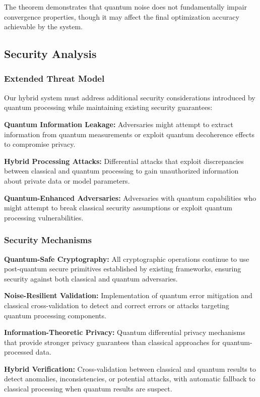 \documentclass[10pt,journal,compsoc]{IEEEtran}
\begin{document}
The theorem demonstrates that quantum noise does not fundamentally impair convergence properties, though it may affect the final optimization accuracy achievable by the system.

\subsection{Security Analysis}

\subsubsection{Extended Threat Model}

Our hybrid system must address additional security considerations introduced by quantum processing while maintaining existing security guarantees:

\textbf{Quantum Information Leakage:} Adversaries might attempt to extract information from quantum measurements or exploit quantum decoherence effects to compromise privacy.

\textbf{Hybrid Processing Attacks:} Differential attacks that exploit discrepancies between classical and quantum processing to gain unauthorized information about private data or model parameters.

\textbf{Quantum-Enhanced Adversaries:} Adversaries with quantum capabilities who might attempt to break classical security assumptions or exploit quantum processing vulnerabilities.

\subsubsection{Security Mechanisms}

\textbf{Quantum-Safe Cryptography:} All cryptographic operations continue to use post-quantum secure primitives established by existing frameworks, ensuring security against both classical and quantum adversaries.

\textbf{Noise-Resilient Validation:} Implementation of quantum error mitigation and classical cross-validation to detect and correct errors or attacks targeting quantum processing components.

\textbf{Information-Theoretic Privacy:} Quantum differential privacy mechanisms that provide stronger privacy guarantees than classical approaches for quantum-processed data.

\textbf{Hybrid Verification:} Cross-validation between classical and quantum results to detect anomalies, inconsistencies, or potential attacks, with automatic fallback to classical processing when quantum results are suspect.
\end{document}
